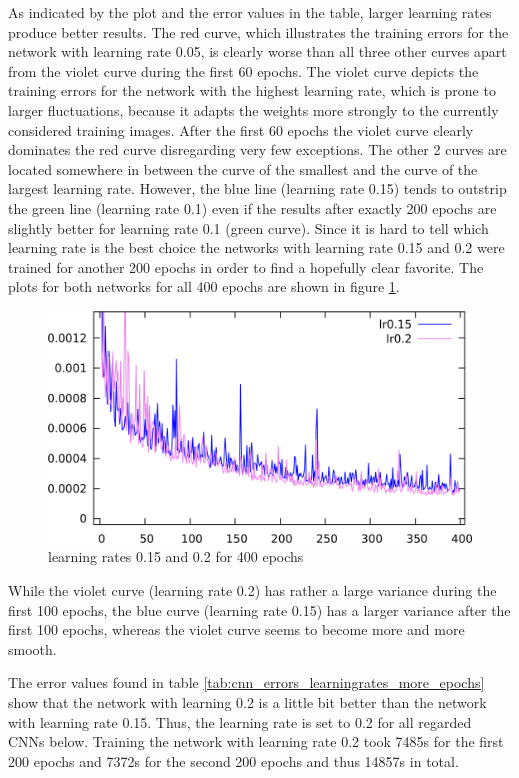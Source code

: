 \documentclass[11pt, a4paper]{article}
\begin{document}


As indicated by the plot and the error values in the table, larger learning rates produce better results. The red curve, which illustrates the training errors for the network with learning rate 0.05, is clearly worse than all three other curves apart from the violet curve during the first 60 epochs. The violet curve depicts the training errors for the network with the highest learning rate, which is prone to larger fluctuations, because it adapts the weights more strongly to the currently considered training images. After the first 60 epochs the violet curve clearly dominates the red curve disregarding very few exceptions. The other 2 curves are located somewhere in between the curve of the smallest and the curve of the largest learning rate. However, the blue line (learning rate 0.15) tends to outstrip the green line (learning rate 0.1) even if the results after exactly 200 epochs are slightly better for learning rate 0.1 (green curve). Since it is hard to tell which learning rate is the best choice the networks with learning rate 0.15 and 0.2 were trained for another 200 epochs in order to find a hopefully clear favorite. The plots for both networks for all 400 epochs are shown in figure \ref{fig:cnn_learningrates_400}.

\begin{figure}[h!]
	\centering
	\includegraphics[width=\textwidth]{results/cnn_learningrates_400.png}
	\caption{learning rates 0.15 and 0.2 for 400 epochs}
	\label{fig:cnn_learningrates_400}
\end{figure}

While the violet curve (learning rate 0.2) has rather a large variance during the first 100 epochs, the blue curve (learning rate 0.15) has a larger variance after the first 100 epochs, whereas the violet curve seems to become more and more smooth. 

The error values found in table \ref{tab:cnn_errors_learningrates_more_epochs} show that the network with learning 0.2 is a little bit better than the network with learning rate 0.15. Thus, the learning rate is set to 0.2 for all regarded \acp{CNN} below. Training the network with learning rate 0.2 took 7485s for the first 200 epochs and 7372s for the second 200 epochs and thus 14857s in total.
\end{document}
